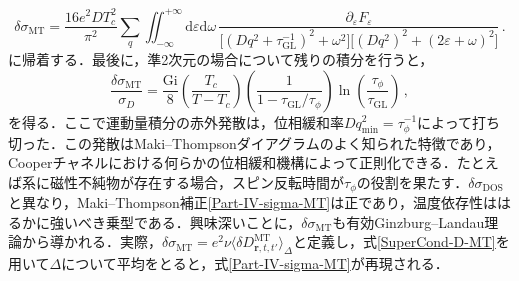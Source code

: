 \documentclass[a4paper,11pt]{ltjsarticle}
\def\d{\mathrm{d}}
\begin{document}
\begin{equation}
\delta\sigma_{\mathrm{MT}}=\frac{16e^{2}DT^{2}_{c}}{\pi^{2}}\sum_{q}
\iint^{+\infty}_{-\infty}\d\varepsilon\d\omega\,
\frac{\partial_{\varepsilon}F_{\varepsilon}}
{\big[(Dq^{2}+\tau^{-1}_{\mathrm{GL}})^{2}+\omega^{2}\big]
\big[(Dq^{2})^{2}+(2\varepsilon+\omega)^{2}\big]}\,.
\end{equation}
に帰着する．最後に，準2次元の場合について残りの積分を行うと，
\begin{equation}\label{Part-IV-sigma-MT}
\frac{\delta\sigma_{\mathrm{MT}}}{\sigma_{D}}=\frac{\mathrm{Gi}}{8}\left(\frac{T_{c}}{T-T_{c}}\right)
\left(\frac{1}{1-\tau_{\mathrm{GL}}/\tau_{\phi}}\right)\ln\left(\frac{\tau_{\phi}}
{\tau_{\mathrm{GL}}}\right)\,,
\end{equation}
を得る．ここで運動量積分の赤外発散は，位相緩和率$Dq^{2}_{\mathrm{min}}=\tau^{-1}_{\phi}$によって打ち切った．この発散はMaki--Thompsonダイアグラムのよく知られた特徴であり，Cooperチャネルにおける何らかの位相緩和機構によって正則化できる．たとえば系に磁性不純物が存在する場合，スピン反転時間が$\tau_{\phi}$の役割を果たす．$\delta\sigma_{\mathrm{DOS}}$と異なり，Maki--Thompson補正\eqref{Part-IV-sigma-MT}は正であり，温度依存性ははるかに強いべき乗型である．興味深いことに，$\delta\sigma_{\mathrm{MT}}$も有効Ginzburg--Landau理論から導かれる．実際，$\delta\sigma_{\mathrm{MT}}=e^{2}\nu\langle\delta D^{\mathrm{MT}}_{\mathbf{r},t,t'}\rangle_{\Delta}$と定義し，式\eqref{SuperCond-D-MT}を用いて$\Delta$について平均をとると，式\eqref{Part-IV-sigma-MT}が再現される．
\end{document}

